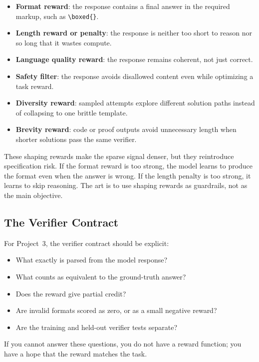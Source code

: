 \begin{itemize}[nosep]
  \item \textbf{Format reward}: the response contains a final answer in the required markup, such as \texttt{\textbackslash boxed\{\}}.
  \item \textbf{Length reward or penalty}: the response is neither too short to reason nor so long that it wastes compute.
  \item \textbf{Language quality reward}: the response remains coherent, not just correct.
  \item \textbf{Safety filter}: the response avoids disallowed content even while optimizing a task reward.
  \item \textbf{Diversity reward}: sampled attempts explore different solution paths instead of collapsing to one brittle template.
  \item \textbf{Brevity reward}: code or proof outputs avoid unnecessary length when shorter solutions pass the same verifier.
\end{itemize}

These shaping rewards make the sparse signal denser, but they reintroduce specification risk. If the format reward is too strong, the model learns to produce the format even when the answer is wrong. If the length penalty is too strong, it learns to skip reasoning. The art is to use shaping rewards as guardrails, not as the main objective.

\subsection{The Verifier Contract}

For Project~3, the verifier contract should be explicit:

\begin{itemize}[nosep]
  \item What exactly is parsed from the model response?
  \item What counts as equivalent to the ground-truth answer?
  \item Does the reward give partial credit?
  \item Are invalid formats scored as zero, or as a small negative reward?
  \item Are the training and held-out verifier tests separate?
\end{itemize}

If you cannot answer these questions, you do not have a reward function; you have a hope that the reward matches the task.

